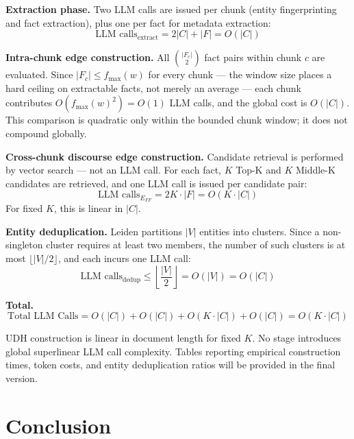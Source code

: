 \documentclass[runningheads]{llncs}
\begin{document}
\textbf{Extraction phase.} Two LLM calls are issued per chunk (entity fingerprinting and fact extraction), plus one per fact for metadata extraction:
\begin{equation}
    \text{LLM calls}_{\text{extract}} = 2|C| + |F| = O(|C|)
\end{equation}

\textbf{Intra-chunk edge construction.} All $\binom{|F_c|}{2}$ fact pairs within chunk $c$ are evaluated. Since $|F_c| \leq f_{\max}(w)$ for every chunk --- the window size places a hard ceiling on extractable facts, not merely an average --- each chunk contributes $O(f_{\max}(w)^2) = O(1)$ LLM calls, and the global cost is $O(|C|)$. This comparison is quadratic only within the bounded chunk window; it does not compound globally.

\textbf{Cross-chunk discourse edge construction.} Candidate retrieval is performed by vector search --- not an LLM call. For each fact, $K$ Top-K and $K$ Middle-K candidates are retrieved, and one LLM call is issued per candidate pair:
\begin{equation}
    \text{LLM calls}_{E_{FF}} = 2K \cdot |F| = O(K \cdot |C|)
\end{equation}
For fixed $K$, this is linear in $|C|$.

\textbf{Entity deduplication.} Leiden partitions $|V|$ entities into clusters. Since a non-singleton cluster requires at least two members, the number of such clusters is at most $\lfloor |V|/2 \rfloor$, and each incurs one LLM call:
\begin{equation}
    \text{LLM calls}_{\text{dedup}} \leq \left\lfloor \frac{|V|}{2} \right\rfloor = O(|V|) = O(|C|)
\end{equation}

\textbf{Total.}
\begin{equation}
    \text{Total LLM Calls} = O(|C|) + O(|C|) + O(K \cdot |C|) + O(|C|) = O(K \cdot |C|)
\end{equation}

UDH construction is linear in document length for fixed $K$. No stage introduces global superlinear LLM call complexity. Tables reporting empirical construction times, token costs, and entity deduplication ratios will be provided in the final version.





\section{Conclusion}
\end{document}
